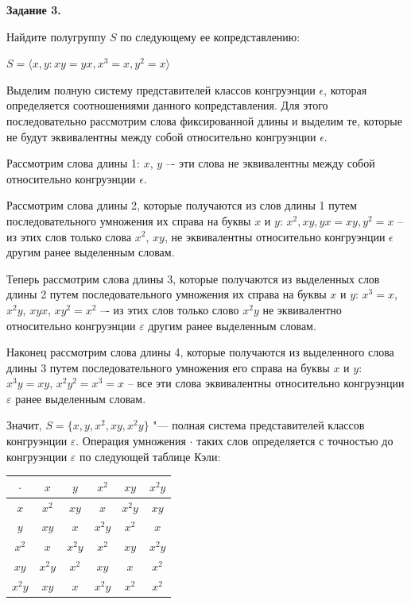 \documentclass[bachelor, och, labwork]{shiza}
\begin{document}
    \textbf{Задание 3.}
    
    Найдите полугруппу $S$ по следующему ее копредставлению:
    \begin{center}

      $S = \langle x,y : xy = yx, x^3 = x, y^2 = x \rangle$
    \end{center}

    Выделим полную систему представителей классов конгруэнции $\epsilon$, которая определяется соотношениями данного
    копредставления. Для этого последовательно рассмотрим слова фиксированной длины и
    выделим те, которые не будут эквивалентны между собой относительно конгруэнции $\epsilon$.

    Рассмотрим слова длины 1: $x$, $y$ –- эти слова не эквивалентны между собой относительно конгруэнции $\epsilon$.

    Рассмотрим слова длины 2, которые получаются из слов
    длины 1 путем последовательного умножения их справа на буквы $x$ и $y$: $x^2, xy, yx = xy, y^2 = x$ -- из этих 
    слов только слова $x^2$, $xy$, не эквивалентны относительно конгруэнции $\epsilon$ другим ранее выделенным словам.

    Теперь рассмотрим слова длины 3, которые получаются из выделенных слов длины 2 путем последовательного
    умножения их справа на буквы $x$ и $y$: $x^3 = x$, $x^2y$, $xyx$,  $xy^2 = x^2$  –- из этих слов только
    слово $x^2y$ не эквивалентно относительно конгруэнции $\varepsilon$ другим ранее выделенным словам.

    Наконец рассмотрим слова длины 4, которые получаются из выделенного слова длины 3 путем последовательного
    умножения его справа на буквы $x$ и $y$: $x^3y = xy$, $x^2y^2 = x^3 = x$ -- все эти слова эквивалентны
    относительно конгруэнции $\varepsilon$ ранее выделенным словам.

        Значит, $S = \{x, y, x^2, xy, x^2y \}$ "--- полная система представителей классов конгруэнции $\varepsilon$.
        Операция умножения $\cdot$ таких слов определяется с точностью до конгруэнции $\varepsilon$ по следующей таблице
        Кэли:

     \begin{table}[H]
          \centering
          \begin{tabular}{|c|c|c|c|c|c|}
          \hline
          $\cdot $ & $x$ & $y$  & $x^2$  & $xy$ & $x^2y$ \\ \hline
          $x$      & $x^2$ & $xy$ & $x$  & $x^2y$ & $xy$ \\ \hline
          $y$      & $xy$ & $x$ & $x^2y$ & $x^2$ & $x$ \\ \hline
          $x^2$     & $x$ & $x^2y$ & $x^2$ & $xy$ & $x^2y$ \\ \hline
          $xy$    & $x^2y$ & $x^2$ & $xy$ & $x$ & $x^2$ \\ \hline
          $x^2y$   & $xy$ &  $x$  &  $x^2y$ & $x^2$ & $x^2$ \\ \hline
          \end{tabular}
        \end{table}
\end{document}
